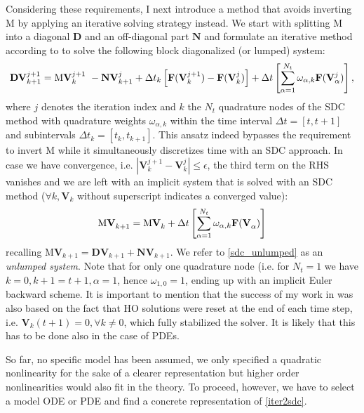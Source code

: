 \documentclass[a4,12pt]{article}
\newcommand{\V}{\mathbf{V}}
\newcommand{\M}{\mathrm{M}}
\newcommand{\Fu}{\mathbf{F}}
\newcommand{\D}{\mathbf{D}}
\newcommand{\N}{\mathbf{N}}
\begin{document}
Considering these requirements, I next introduce a method that avoids inverting $\M$ by applying an iterative solving strategy instead. We start with splitting $\M$ into a diagonal $\mathbf{D}$ and an off-diagonal part $\mathbf{N}$ and formulate an
iterative method according to \cite{Abgrall16} to solve the following
block diagonalized (or lumped) system:
\vspace{-0.75em}
\begin{equation}\label{iter2sdc}
   \D \V^{j +1}_{k +1} =
          \M \V^{j + 1}_{k} \
        - \N \V^{j}_{k + 1}
                    + \Delta t_k \left[ \Fu(\V^{j+1}_{k}) - \Fu(\V^{j}_{k})\right]
                    + \Delta t \left[ \sum_{\alpha=1}^{N_t} \omega_{\alpha,k}\Fu(\V^{j}_\alpha) \right],
\vspace{-0.5em}
\end{equation}
where $j$ denotes the iteration index and $k$ the $N_t$ quadrature nodes of the SDC method with quadrature weights $\omega_{\alpha,k}$ \cite{Dutt2000} within the time interval $\Delta t = [t,t+1]$ and subintervals $\Delta t_k = [t_k,t_{k+1}]$. This ansatz indeed bypasses the requirement to invert $\M$ while it simultaneously discretizes time with an SDC approach.
In case we have convergence, i.e. $|\V^{j + 1}_{k} - \V^{j}_{k}| \leq \epsilon$, the third term on the RHS vanishes and we are left with an implicit system that is solved with an SDC method ($\forall k, \V^{}_{k}$ without superscript indicates a converged value):
\vspace{-0.5em}
\begin{equation}\label{sdc_unlumped}
\M \V^{}_{k +1} =
   \M \V^{}_{k} + \Delta t \left[ \sum_{\alpha=1}^{N_t} \omega_{\alpha,k}\Fu(\V^{}_\alpha) \right]
\vspace{-0.5em}
\end{equation}
recalling $\M \V^{}_{k +1} = \D \V^{}_{k +1} + \N \V^{}_{k + 1} $. We refer to
\eqref{sdc_unlumped} as an \emph{unlumped system}. Note that for only one quadrature node (i.e. for ${N_t}=1$ we have $k=0,k+1 = t+1, \alpha =1$, hence $\omega_{1,0} = 1$, ending up with an implicit Euler backward scheme.
It is important to mention that the success of my work in \cite{Bauer22} was also based on the fact that HO solutions were reset at the end of each time step, i.e. $\V_k(t+1) =0, \forall k \neq 0$, which fully stabilized the solver. It is likely that this has to be done also in the case of PDEs.

So far, no specific model has been assumed, we only specified a quadratic nonlinearity for the sake of a clearer representation but higher order nonlinearities would also fit in the theory. To proceed, however, we have to select a model ODE or PDE and find a concrete representation of \eqref{iter2sdc}.
\end{document}
